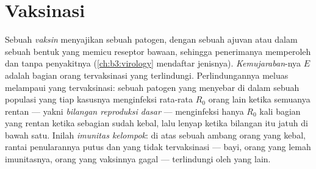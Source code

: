 \section{Vaksinasi}

\begin{definition}\label{def:b3:adaptive-immunity:vaccine}
%
Sebuah \emph{vaksin} menyajikan  sebuah patogen, dengan sebuah ajuvan
atau dalam sebuah bentuk yang memicu reseptor bawaan, sehingga penerimanya
memperoleh  dan  tanpa penyakitnya
(\cref{ch:b3:virology} mendaftar jenisnya). \emph{Kemujaraban}-nya $E$ adalah
bagian orang tervaksinasi yang terlindungi. Perlindungannya meluas melampaui
yang tervaksinasi: sebuah patogen yang menyebar di dalam sebuah populasi yang
tiap kasusnya menginfeksi rata-rata $R_{0}$ orang lain ketika semuanya rentan
--- yakni \emph{bilangan reproduksi dasar} --- menginfeksi hanya $R_{0}$ kali
bagian yang rentan ketika sebagian sudah kebal, lalu lenyap ketika
bilangan itu jatuh di bawah satu. Inilah \emph{imunitas kelompok}: di atas sebuah
ambang orang yang kebal, rantai penularannya putus dan yang tidak tervaksinasi
--- bayi, orang yang lemah imunitasnya, orang yang vaksinnya gagal
--- terlindungi oleh yang lain.
\end{definition}

